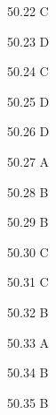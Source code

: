\begin{Solution}{50.{22}}
C
\end{Solution}
\begin{Solution}{50.{23}}
D
\end{Solution}
\begin{Solution}{50.{24}}
C
\end{Solution}
\begin{Solution}{50.{25}}
D
\end{Solution}
\begin{Solution}{50.{26}}
D
\end{Solution}
\begin{Solution}{50.{27}}
A
\end{Solution}
\begin{Solution}{50.{28}}
B
\end{Solution}
\begin{Solution}{50.{29}}
B
\end{Solution}
\begin{Solution}{50.{30}}
C
\end{Solution}
\begin{Solution}{50.{31}}
C
\end{Solution}
\begin{Solution}{50.{32}}
B
\end{Solution}
\begin{Solution}{50.{33}}
A
\end{Solution}
\begin{Solution}{50.{34}}
B
\end{Solution}
\begin{Solution}{50.{35}}
B
\end{Solution}
